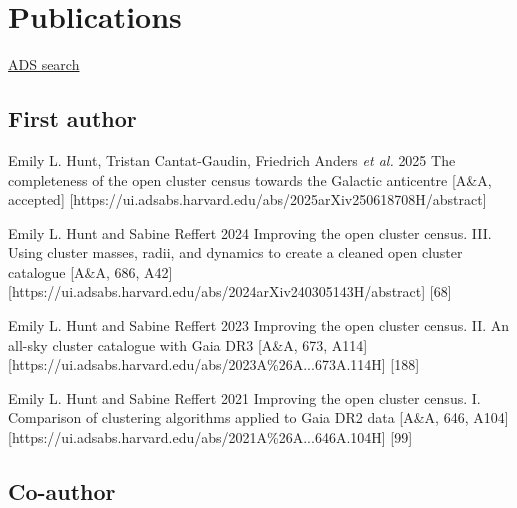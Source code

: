 \section*{Publications}

\href{\cvADSLink}{ADS search \faLink}%


\subsection*{First author}

\begin{etaremune}
    \item \publication
        {Emily L. Hunt, Tristan Cantat-Gaudin, Friedrich Anders \emph{et al.}}
        {2025}
        {The completeness of the open cluster census towards the Galactic anticentre}
        [A\&A, accepted]
        [https://ui.adsabs.harvard.edu/abs/2025arXiv250618708H/abstract]
    \item \publication
        {Emily L. Hunt and Sabine Reffert}
        {2024}
        {Improving the open cluster census. III. Using cluster masses, radii, and dynamics to create a cleaned open cluster catalogue}
        [A\&A, 686, A42]
        [https://ui.adsabs.harvard.edu/abs/2024arXiv240305143H/abstract]
        [68]
    \item \publication
        {Emily L. Hunt and Sabine Reffert}
        {2023}
        {Improving the open cluster census. II. An all-sky cluster catalogue with Gaia DR3}
        [A\&A, 673, A114]
        [https://ui.adsabs.harvard.edu/abs/2023A\%26A...673A.114H]
        [188]
    \item \publication
        {Emily L. Hunt and Sabine Reffert}
        {2021}
        {Improving the open cluster census. I. Comparison of clustering algorithms applied to Gaia DR2 data}
        [A\&A, 646, A104]
        [https://ui.adsabs.harvard.edu/abs/2021A\%26A...646A.104H]
        [99]
\end{etaremune}


\subsection*{Co-author}

